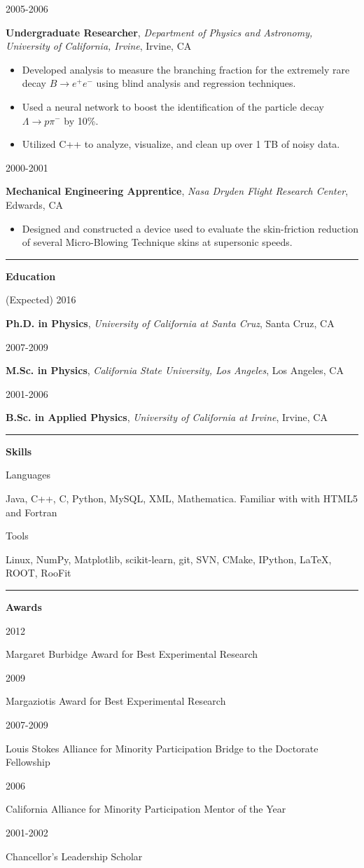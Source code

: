 \documentclass[11pt]{article}
\newcommand{\resumesection}[1] {
    \noindent
    \textcolor{indigodye}{\rule{.15\textwidth}{.1in} \hspace{0.01 \textwidth} \textbf{\Large{#1}}} \newline
}
\newcommand{\experienceentry}[5] { 
    \noindent
    \begin{minipage}[t]{0.15\textwidth} \begin{flushright} #1 \end{flushright} \end{minipage} \hspace{0.01\textwidth}
    \begin{minipage}[t]{0.84\textwidth} 
        \textbf{#2}, \emph{#3}, #4 
        #5
    \end{minipage}
}
\newcommand{\educationentry}[4] { 
    \noindent
    \begin{minipage}[t]{0.15\textwidth} \begin{flushright} #1 \end{flushright} \end{minipage} \hspace{0.01\textwidth}
    \begin{minipage}[t]{0.84\textwidth} 
        \textbf{#2}, \emph{#3}, #4
    \end{minipage}
}
\newcommand{\skillsentry}[2] { 
    \noindent
    \begin{minipage}[t]{0.15\textwidth} \begin{flushright} #1 \end{flushright} \end{minipage} \hspace{0.01\textwidth}
    \begin{minipage}[t]{0.84\textwidth} #2 \end{minipage}
}
\newcommand{\awardentry}[2] { 
    \noindent
    \begin{minipage}[t]{0.15\textwidth} \begin{flushright} #1 \end{flushright} \end{minipage} \hspace{0.01\textwidth}
    \begin{minipage}[t]{0.84\textwidth} #2 \end{minipage}
}
\begin{document}
        \experienceentry{2005-2006}
                        {Undergraduate Researcher}
                        {Department of Physics and Astronomy, University of California, Irvine}
                        {Irvine, CA}
                        { 
                          \begin{itemize}[label=\textcolor{indigodye}{$\circ$}, noitemsep, nolistsep, leftmargin=*]
                            \item Developed analysis to measure the branching fraction for the extremely rare decay 
                                  $B\rightarrow e^+e^-$ using blind analysis and regression techniques.
                            \item Used a neural network to boost the identification of the particle decay 
                                  $\Lambda \rightarrow p \pi^-$ by 10\%.
                            \item Utilized C++ to analyze, visualize, and clean up over 1 TB of noisy data.
                          \end{itemize}
                       }
        \experienceentry{2000-2001}
                        {Mechanical Engineering Apprentice}
                        {Nasa Dryden Flight Research Center}
                        {Edwards, CA}
                        {
                          \begin{itemize}[label=\textcolor{indigodye}{$\circ$}, noitemsep, nolistsep, leftmargin=*]
                            \item Designed and constructed a device used to evaluate the skin-friction reduction 
                                  of several Micro-Blowing Technique skins at supersonic speeds. 
                          \end{itemize}
                       }

    \resumesection{Education}
        \educationentry{(Expected) 2016}
                       {Ph.D. in Physics}
                       {University of California at Santa Cruz}
                       {Santa Cruz, CA}
        \educationentry{2007-2009}
                       {M.Sc. in Physics}
                       {California State University, Los Angeles}
                       {Los Angeles, CA}
        \educationentry{2001-2006}
                       {B.Sc. in Applied Physics}
                       {University of California at Irvine}
                       {Irvine, CA}

    \resumesection{Skills}
    \skillsentry{Languages}{Java, C++, C, Python, MySQL, XML, Mathematica. Familiar with with HTML5 and Fortran}
        \skillsentry{Tools}{Linux, NumPy, Matplotlib, scikit-learn, git, SVN, CMake, IPython, \LaTeX, ROOT, RooFit}

    \resumesection{Awards}
        \awardentry{2012}{Margaret Burbidge Award for Best Experimental Research}
        \awardentry{2009}{Margaziotis Award for Best Experimental Research}
        \awardentry{2007-2009}{Louis Stokes Alliance for Minority Participation Bridge to the Doctorate 
                               Fellowship}
        \awardentry{2006}{California Alliance for Minority Participation Mentor of the Year}
        \awardentry{2001-2002}{Chancellor's Leadership Scholar}
\end{document}
